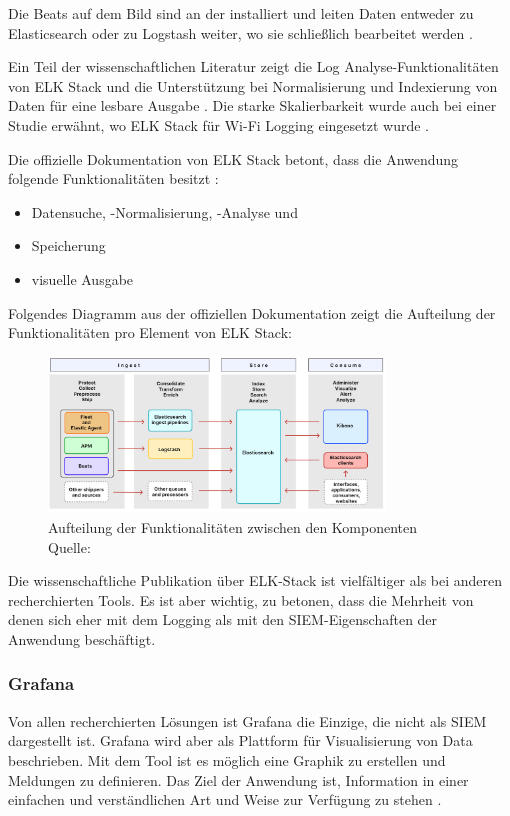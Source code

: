 Die Beats auf dem Bild sind an der  installiert und leiten Daten entweder zu Elasticsearch oder zu Logstash weiter, wo sie schließlich bearbeitet werden \citep{Jain_LMELK}. 

Ein Teil der wissenschaftlichen Literatur zeigt die Log Analyse-Funktionalitäten von ELK Stack und die Unterstützung bei Normalisierung und Indexierung von Daten für eine lesbare Ausgabe \citep{Advani_elkstakc}. Die starke Skalierbarkeit wurde auch bei einer Studie erwähnt, wo ELK Stack für Wi-Fi Logging eingesetzt wurde \citep{Wang_elkwifi}. 

Die offizielle Dokumentation von ELK Stack betont, dass die Anwendung folgende Funktionalitäten besitzt \citep{elastic_docs}: 

\begin{itemize}[noitemsep]
   \item Datensuche, -Normalisierung, -Analyse und 
   \item Speicherung
   \item visuelle Ausgabe
\end{itemize}

Folgendes Diagramm aus der offiziellen Dokumentation zeigt die Aufteilung der Funktionalitäten pro Element von ELK Stack:

\begin{figure}[H]
   \centering
   \includegraphics[width=0.8\textwidth]{assets/2_p9.png}
   \caption{Aufteilung der Funktionalitäten zwischen den Komponenten\\Quelle: \citep{elastic_docs}}
   \centering
\end{figure}

Die wissenschaftliche Publikation über ELK-Stack ist vielfältiger als bei anderen recherchierten Tools. Es ist aber wichtig, zu betonen, dass die Mehrheit von denen sich eher mit dem Logging als mit den \gls{SIEM}-Eigenschaften der Anwendung beschäftigt.


\subsubsection{Grafana}
Von allen recherchierten Lösungen ist Grafana die Einzige, die nicht als \gls{SIEM} dargestellt ist. Grafana wird aber als Plattform für Visualisierung von Data beschrieben. Mit dem Tool ist es möglich eine Graphik zu erstellen und Meldungen zu definieren. Das Ziel der Anwendung ist, Information in einer einfachen und verständlichen Art und Weise zur Verfügung zu stehen \citep{redhat_grafana}.  

